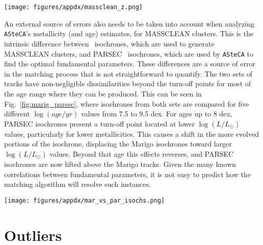 \documentclass[draft]{aa}
\renewcommand{\includegraphics}[2][]{}
\begin{document}
\begin{appendix}
\begin{figure*}
\texttt{[image: figures/appdx/massclean\_z.png]}
\caption{\texttt{ASteCA} metallicity estimates for each mass used to generate
MASSCLEAN clusters. Colors are associated with $\log(age/yr)$ differences, shown
in the color bars to the right. The green dashed horizontal line is the $\Delta
[Fe/H]{=}0$ line, shown as reference.}
\label{fig:massclean_z}
\end{figure*}

An external source of errors also needs to be taken into account when analyzing
\texttt{ASteCA}'s metallicity (and age) estimates, for MASSCLEAN clusters.
%
This is the intrinsic difference between~\cite{Marigo_2008} isochrones, which are used to generate MASSCLEAN clusters, and PARSEC~\citep{Bressan_2012}
isochrones, which are used by \texttt{ASteCA} to find the optimal fundamental
parameters. These differences are a source of error in the matching
process that is not straightforward to quantify.
%
The two sets of tracks have non-negligible dissimilarities beyond the turn-off
points for most of the age range where they can be produced. This can be seen
in Fig.~\ref{fig:marig_parsec}, where isochrones from both sets are compared for
five different $\log(age/yr)$ values from 7.5 to 9.5 dex.
%
For ages up to 8 dex, PARSEC isochrones present a turn-off point located at
lower $\log(L/L_{\odot})$ values, particularly for lower metallicities. This
causes a shift in the more evolved portions of the isochrone, displacing the
Marigo isochrones toward larger $\log(L/L_{\odot})$ values.
%
Beyond that age this effects reverses, and PARSEC isochrones are now lifted
above the Marigo tracks. Given the many known correlations between fundamental
parameters, it is not easy to predict how the matching algorithm will resolve
such instances.

\begin{figure*}
\texttt{[image: figures/appdx/mar\_vs\_par\_isochs.png]}
\caption{\cite{Marigo_2008} vs. PARSEC~\citep{Bressan_2012} isochrones for
different metallicities and ages.}
\label{fig:marig_parsec}
\end{figure*}





\section{Outliers}
\label{apdx:outliers}


\end{appendix}
\end{document}

